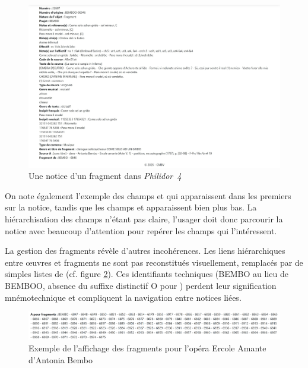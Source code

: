 \begin{center}
	\begin{figure}[h]
		\caption{Une notice d'un fragment dans \textit{Philidor~4}} \label{notice_frag}
		\centering
		\includegraphics[width=\textwidth]{images/Capture_ecran_notice_frag.jpeg}
	\end{figure}
\end{center}

On note également l'exemple des champs  et  qui apparaissent dans les premiers sur la notice, tandis que les champs  et  apparaissent bien plus bas. La hiérarchisation des champs n'étant pas claire, l'usager doit donc parcourir la notice avec beaucoup d'attention pour repérer les champs qui l'intéressent.

La gestion des fragments révèle d'autres incohérences. Les liens hiérarchiques entre œuvres et fragments ne sont pas reconstitués visuellement, remplacés par de simples listes de  (cf. figure \ref{frag_ercole_amante}). Ces identifiants techniques (BEMBO au lieu de BEMBOO, absence du suffixe distinctif O pour ) perdent leur signification mnémotechnique et compliquent la navigation entre notices liées.

\begin{figure}[h]
	\caption{Exemple de l'affichage des fragments pour l'opéra Ercole Amante d'Antonia Bembo} \label{frag_ercole_amante}
	\centering
	\includegraphics[width=\textwidth]{images/Capture_ecran_ex_frag.jpeg}
\end{figure}

